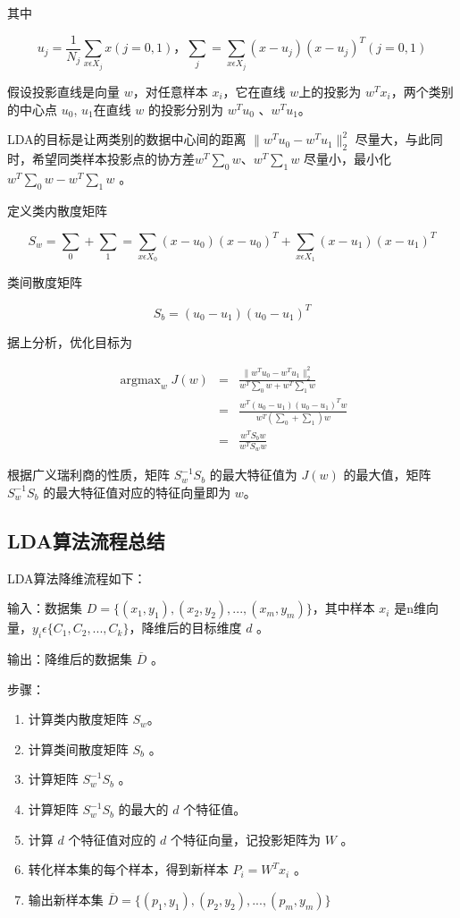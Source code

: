 其中

$$
u_j = \frac{1}{N_j} \sum_{ x\epsilon X_j} x(j=0,1)，
\sum_j = \sum_{ x\epsilon X_j}( x-u_j)( x-u_j)^T(j=0,1)
$$

假设投影直线是向量 $ w$，对任意样本 $ x_i$，它在直线 $w$上的投影为 $ w^Tx_i$，两个类别的中心点 $u_0$, $u_1 $在直线 $w$ 的投影分别为 $ w^Tu_0$ 、$ w^Tu_1$。

LDA的目标是让两类别的数据中心间的距离 $\|  w^Tu_0 -  w^Tu_1 \|^2_2$ 尽量大，与此同时，希望同类样本投影点的协方差$ w^T \sum_0  w$、$ w^T \sum_1  w$ 尽量小，最小化 $ w^T \sum_0  w -  w^T \sum_1  w$ 。

定义类内散度矩阵

$$
S_w = \sum_0 + \sum_1 =
	\sum_{ x\epsilon X_0}( x-u_0)( x-u_0)^T +
	\sum_{ x\epsilon X_1}( x-u_1)( x-u_1)^T
$$

类间散度矩阵

$$S_b = (u_0 - u_1)(u_0 - u_1)^T$$

据上分析，优化目标为

\begin{eqnarray*}
	\mathop{\arg\max}_w J( w) &=& \frac{\|  w^Tu_0 -  w^Tu_1 \|^2_2}{ w^T \sum_0 w +  w^T \sum_1 w} \\
	&=& \frac{ w^T(u_0-u_1)(u_0-u_1)^T w}{ w^T(\sum_0 + \sum_1) w} \\
	&=& \frac{ w^TS_b w}{ w^TS_w w}
\end{eqnarray*}

根据广义瑞利商的性质，矩阵 $S^{-1}_{w} S_b$ 的最大特征值为 $J( w)$ 的最大值，矩阵 $S^{-1}_{w} S_b$ 的最大特征值对应的特征向量即为 $ w$。

\subsection{LDA算法流程总结}

LDA算法降维流程如下：

输入：数据集 $D = \{ (x_1,y_1),(x_2,y_2), ... ,(x_m,y_m) \}$，其中样本 $x_i $ 是n维向量，$y_i  \epsilon \{C_1, C_2, ..., C_k\}$，降维后的目标维度 $d$ 。

输出：降维后的数据集 $\overline{D} $ 。

步骤：

\begin{enumerate}
\itemsep0em
\item 计算类内散度矩阵 $S_w$。
\item 计算类间散度矩阵 $S_b$ 。
\item 计算矩阵 $S^{-1}_wS_b$ 。
\item 计算矩阵 $S^{-1}_wS_b$ 的最大的 $d$ 个特征值。
\item 计算 $d$ 个特征值对应的 $d$ 个特征向量，记投影矩阵为 $W$ 。
\item 转化样本集的每个样本，得到新样本 $P_i = W^Tx_i$ 。
\item 输出新样本集 $\overline{D} = \{ (p_1,y_1),(p_2,y_2),...,(p_m,y_m) \}$
\end{enumerate}

